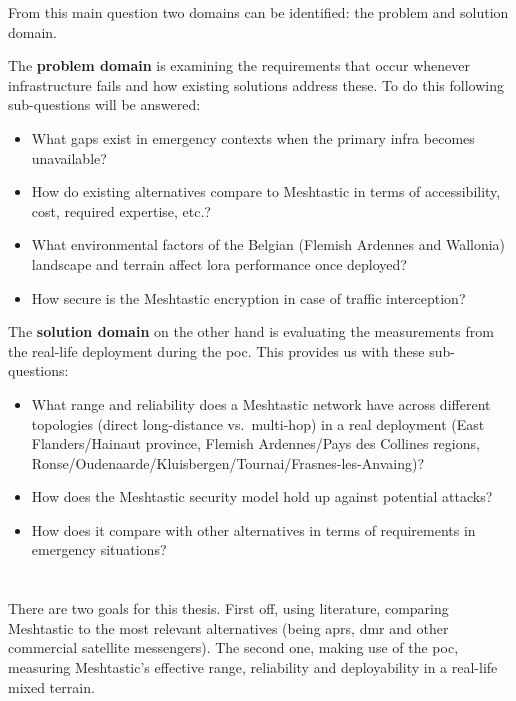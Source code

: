 From this main question two domains can be identified: the problem and solution domain.

The \textbf{problem domain} is examining the requirements that occur whenever infrastructure fails and how existing solutions address these.
To do this following sub-questions will be answered:
\begin{itemize}
  \item What gaps exist in emergency contexts when the primary infra becomes unavailable?
  \item How do existing alternatives compare to Meshtastic in terms of accessibility, cost, required expertise, etc.?
  \item What environmental factors of the Belgian (Flemish Ardennes and Wallonia) landscape and terrain affect \gls{lora} performance once deployed?
  \item How secure is the Meshtastic encryption in case of traffic interception?
\end{itemize}

The \textbf{solution domain} on the other hand is evaluating the measurements from the real-life deployment during the \gls{poc}.
This provides us with these sub-questions:
\begin{itemize}
  \item What range and reliability does a Meshtastic network have across different topologies (direct long-distance
  vs.\ multi-hop) in a real deployment (East Flanders/Hainaut province, Flemish Ardennes/Pays des Collines regions, Ronse/\allowbreak{}Oudenaarde/\allowbreak{}Kluisbergen/\allowbreak{}Tournai/\allowbreak{}Frasnes-les-Anvaing)?
  \item How does the Meshtastic security model hold up against potential attacks?
  \item How does it compare with other alternatives in terms of requirements in emergency situations?
\end{itemize}

\section{}%
\label{sec:onderzoeksdoelstelling}

There are two goals for this thesis.
First off, using literature, comparing Meshtastic to the most relevant alternatives (being \gls{aprs}, \gls{dmr} and other commercial satellite messengers).
The second one, making use of the \gls{poc}, measuring Meshtastic's effective range, reliability and deployability in a real-life mixed terrain.

